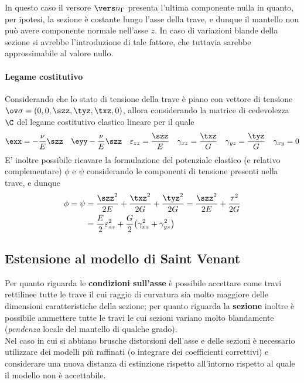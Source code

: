 		\begin{nota}
			In questo caso il versore $\vers n_\Gamma$ presenta l'ultima componente nulla in quanto, per ipotesi, la sezione è costante lungo l'asse della trave, e dunque il mantello non può avere componente normale nell'asse $z$. In caso di variazioni blande della sezione si avrebbe l'introduzione di tale fattore, che tuttavia sarebbe approssimabile al valore nullo.
			
		\end{nota}
		
		\paragraph{Legame costitutivo} Considerando che lo stato di tensione della trave è piano con vettore di tensione $\ov \sigma= (0,0,\szz,\tyz,\txz,0)$, allora considerando la matrice di cedevolezza $\C$ del legame costitutivo elastico lineare per il quale
		\[ \exx = - \frac \nu E \szz \quad \eyy -\frac \nu E \szz \quad \varepsilon_{zz} = \frac \szz E \quad \gamma_{xz} = \frac \txz G \quad \gamma_{yz} = \frac \tyz G \quad \gamma_{xy} = 0  \]
		E' inoltre possibile ricavare la formulazione del potenziale elastico (e relativo complementare) $\phi$ e $\psi$ considerando le componenti di tensione presenti nella trave, e dunque
		\begin{align*}
			\phi = \psi & = \frac{\szz^2}{2E} + \frac{\txz^2}{2G} + \frac{\tyz^2}{2G} = \frac{\szz^2}{2E} + \frac{\tau^2}{2G} \\ 
			& = \frac E 2 \varepsilon_{zz}^2 + \frac G 2 \big(\gamma_{xz}^2 + \gamma_{yz}^2\big)
		\end{align*}
		
	\subsection{Estensione al modello di Saint Venant}
		Per quanto riguarda le \textbf{condizioni sull'asse} è possibile accettare come travi rettilinee tutte le trave il cui raggio di curvatura sia molto maggiore delle dimensioni caratteristiche della sezione; per quanto riguarda la \textbf{sezione} inoltre è possibile ammettere tutte le travi le cui sezioni variano molto blandamente (\textit{pendenza} locale del mantello di qualche grado). \\
		Nel caso in cui si abbiano brusche distorsioni dell'asse e delle sezioni è necessario utilizzare dei modelli più raffinati (o integrare dei coefficienti correttivi) e considerare una nuova distanza di estinzione rispetto all'intorno rispetto al quale il modello non è accettabile.
		
